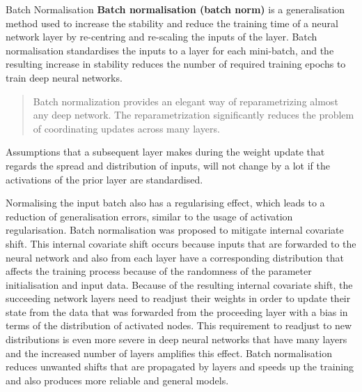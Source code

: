   \begin{pabox}{Batch Normalisation}
  \label{def:batch-normalisation-definition}
    \textbf{Batch normalisation (batch norm)} is a generalisation method used to increase the stability and reduce the training time of a neural network layer by re-centring and re-scaling the inputs of the layer.
    Batch normalisation standardises the inputs to a layer for each mini-batch, and the resulting increase in stability reduces the number of required training epochs to train deep neural networks.

    \begin{quote}
      Batch normalization provides an elegant way of reparametrizing almost any deep network. 
      The reparametrization significantly reduces the problem of coordinating updates across many layers.
      \cite{goodfellowDeepLearning2016}
    \end{quote}
    Assumptions that a subsequent layer makes during the weight update that regards the spread and distribution of inputs, will not change by a lot if the activations of the prior layer are standardised. 
  \end{pabox}
  Normalising the input batch also has a regularising effect, which leads to a reduction of generalisation errors, similar to the usage of activation regularisation.
  Batch normalisation was proposed to mitigate internal covariate shift. This internal covariate shift occurs because inputs that are forwarded to the neural network and also from each layer have a corresponding distribution that affects the training process because of the randomness of the parameter initialisation and input data.
  Because of the resulting internal covariate shift, the succeeding network layers need to readjust their weights in order to update their state from the data that was forwarded from the proceeding layer with a bias in terms of the distribution of activated nodes. This requirement to readjust to new distributions is even more severe in deep neural networks that have many layers and the increased number of layers amplifies this effect. Batch normalisation reduces unwanted shifts that are propagated by layers and speeds up the training and also produces more reliable and general models.
  


